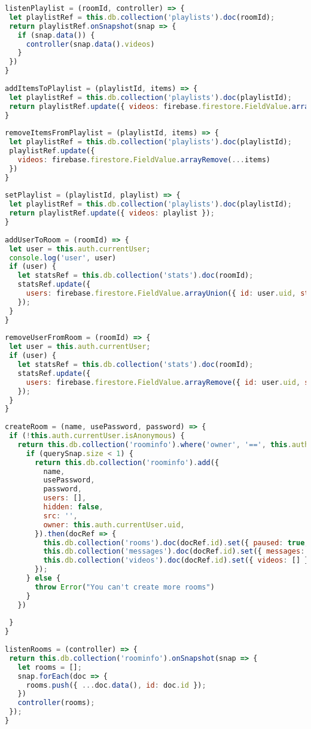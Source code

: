 \begin{lstlisting}[language=JavaScript,label={lst:add:player}]
listenPlaylist = (roomId, controller) => {
 let playlistRef = this.db.collection('playlists').doc(roomId);
 return playlistRef.onSnapshot(snap => {
   if (snap.data()) {
     controller(snap.data().videos)
   }
 })
}
 
addItemsToPlaylist = (playlistId, items) => {
 let playlistRef = this.db.collection('playlists').doc(playlistId);
 return playlistRef.update({ videos: firebase.firestore.FieldValue.arrayUnion(...items) });
}
 
removeItemsFromPlaylist = (playlistId, items) => {
 let playlistRef = this.db.collection('playlists').doc(playlistId);
 playlistRef.update({
   videos: firebase.firestore.FieldValue.arrayRemove(...items)
 })
}
 
setPlaylist = (playlistId, playlist) => {
 let playlistRef = this.db.collection('playlists').doc(playlistId);
 return playlistRef.update({ videos: playlist });
}
 
addUserToRoom = (roomId) => {
 let user = this.auth.currentUser;
 console.log('user', user)
 if (user) {
   let statsRef = this.db.collection('stats').doc(roomId);
   statsRef.update({
     users: firebase.firestore.FieldValue.arrayUnion({ id: user.uid, status: null })
   });
 }
}
 
removeUserFromRoom = (roomId) => {
 let user = this.auth.currentUser;
 if (user) {
   let statsRef = this.db.collection('stats').doc(roomId);
   statsRef.update({
     users: firebase.firestore.FieldValue.arrayRemove({ id: user.uid, status: null })
   });
 }
}
 
createRoom = (name, usePassword, password) => {
 if (!this.auth.currentUser.isAnonymous) {
   return this.db.collection('roominfo').where('owner', '==', this.auth.currentUser.uid).get().then((querySnap) => {
     if (querySnap.size < 1) {
       return this.db.collection('roominfo').add({
         name,
         usePassword,
         password,
         users: [],
         hidden: false,
         src: '',
         owner: this.auth.currentUser.uid,
       }).then(docRef => {
         this.db.collection('rooms').doc(docRef.id).set({ paused: true, src: '', time: 0, })
         this.db.collection('messages').doc(docRef.id).set({ messages: [] });
         this.db.collection('videos').doc(docRef.id).set({ videos: [] });
       });
     } else {
       throw Error("You can't create more rooms")
     }
   })
 
 }
}
 
listenRooms = (controller) => {
 return this.db.collection('roominfo').onSnapshot(snap => {
   let rooms = [];
   snap.forEach(doc => {
     rooms.push({ ...doc.data(), id: doc.id });
   })
   controller(rooms);
 });
}
 

\end{lstlisting}
